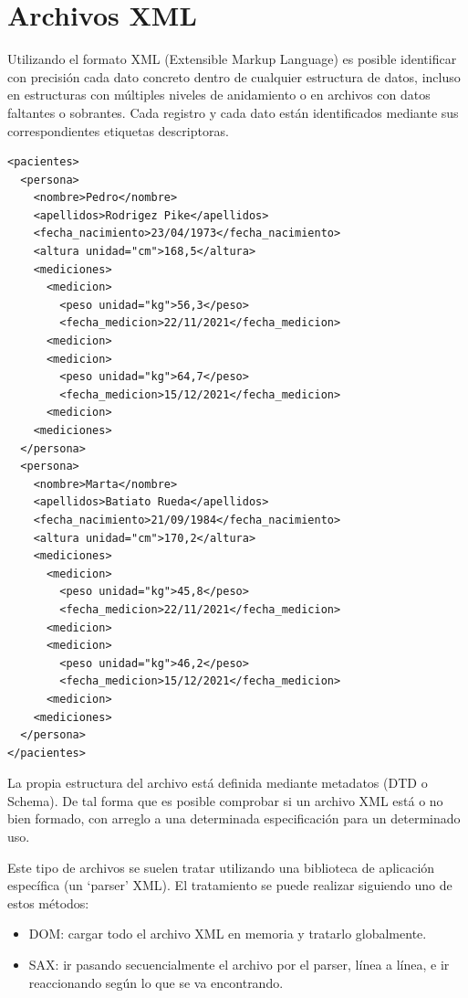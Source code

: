 \documentclass[spanish,12pt,a4paper,final,oneside]{book}
\begin{document}
\section{Archivos XML}
Utilizando el formato XML (Extensible Markup Language) es posible identificar con precisión cada dato concreto dentro de cualquier estructura de datos, incluso en estructuras con múltiples niveles de anidamiento o en archivos con datos faltantes o sobrantes. Cada registro y cada dato están identificados mediante sus correspondientes etiquetas descriptoras.

\begin{lstlisting}[frame=single, basicstyle=\scriptsize]
<pacientes>
  <persona>
    <nombre>Pedro</nombre>
    <apellidos>Rodrigez Pike</apellidos>
    <fecha_nacimiento>23/04/1973</fecha_nacimiento>
    <altura unidad="cm">168,5</altura>
    <mediciones>
      <medicion>
        <peso unidad="kg">56,3</peso>
        <fecha_medicion>22/11/2021</fecha_medicion>
      <medicion>
      <medicion>
        <peso unidad="kg">64,7</peso>
        <fecha_medicion>15/12/2021</fecha_medicion>
      <medicion>
    <mediciones>
  </persona>
  <persona>
    <nombre>Marta</nombre>
    <apellidos>Batiato Rueda</apellidos>
    <fecha_nacimiento>21/09/1984</fecha_nacimiento>
    <altura unidad="cm">170,2</altura>
    <mediciones>
      <medicion>
        <peso unidad="kg">45,8</peso>
        <fecha_medicion>22/11/2021</fecha_medicion>
      <medicion>
      <medicion>
        <peso unidad="kg">46,2</peso>
        <fecha_medicion>15/12/2021</fecha_medicion>
      <medicion>
    <mediciones>
  </persona>
</pacientes> 
\end{lstlisting}


La propia estructura del archivo está definida mediante metadatos (DTD o Schema). De tal forma que es posible comprobar si un archivo XML está o no bien formado, con arreglo a una determinada especificación para un determinado uso.

Este tipo de archivos se suelen tratar utilizando una biblioteca de aplicación específica (un `parser' XML). El tratamiento se puede realizar siguiendo uno de estos métodos:
\begin{itemize}
\item DOM: cargar todo el archivo XML en memoria y tratarlo globalmente.
\item SAX: ir pasando secuencialmente el archivo por el parser, línea a línea, e ir reaccionando según lo que se va encontrando.
\end{itemize}  
\end{document}

